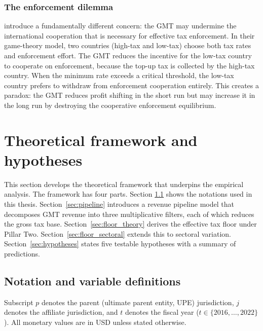 \documentclass[11pt,a4paper]{article}
\begin{document}
\subsubsection{The enforcement dilemma}

\citet{jean2026} introduce a fundamentally different concern: the GMT may undermine the international cooperation that is necessary for effective tax enforcement. In their game-theory model, two countries (high-tax and low-tax) choose both tax rates and enforcement effort. The GMT reduces the incentive for the low-tax country to cooperate on enforcement, because the top-up tax is collected by the high-tax country. When the minimum rate exceeds a critical threshold, the low-tax country prefers to withdraw from enforcement cooperation entirely. This creates a paradox: the GMT reduces profit shifting in the short run but may increase it in the long run by destroying the cooperative enforcement equilibrium.

\newpage

\section{Theoretical framework and hypotheses}\label{sec:theory}

This section develops the theoretical framework that underpins the empirical analysis. The framework has four parts. Section \ref{sec:notation} shows the notations used in this thesis. Section~\ref{sec:pipeline} introduces a revenue pipeline model that decomposes GMT revenue into three multiplicative filters, each of which reduces the gross tax base. Section~\ref{sec:floor_theory} derives the effective tax floor under Pillar Two. Section~\ref{sec:floor_sectoral} extends this to sectoral variation. Section~\ref{sec:hypotheses} states five testable hypotheses with a summary of predictions.

\subsection{Notation and variable definitions}\label{sec:notation}

Subscript $p$ denotes the parent (ultimate parent entity, UPE) jurisdiction, $j$ denotes the affiliate jurisdiction, and $t$ denotes the fiscal year ($t \in \{2016, \ldots, 2022\}$). All monetary values are in USD unless stated otherwise.
\end{document}
